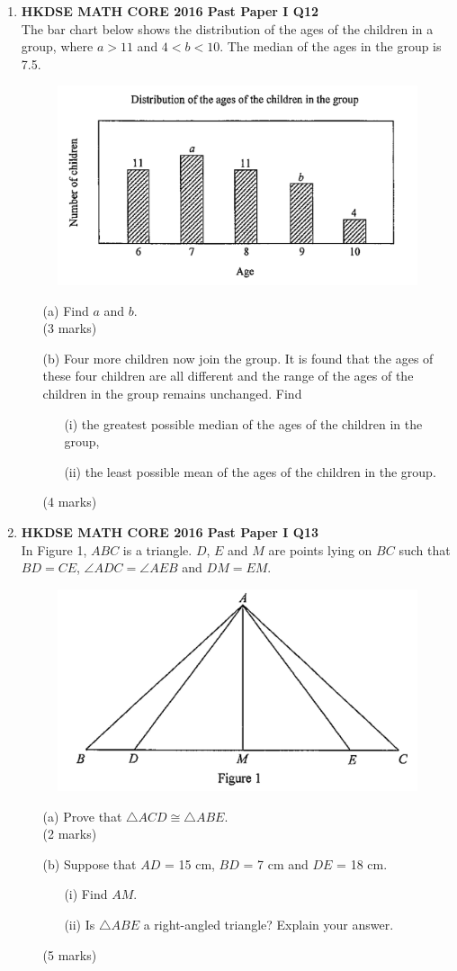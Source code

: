 \documentclass[12pt]{article}
\begin{document}
\begin{enumerate}
	\item \textbf{HKDSE MATH CORE 2016 Past Paper I Q12}\\
	The bar chart below shows the distribution of the ages of the children in a group, where $a > 11$ and $4 < b < 10$. The median of the ages in the group is 7.5.
	\begin{figure}[H]
		\centering
		\includegraphics[width = .3\linewidth]{2016Figure1.00}
	\end{figure}
	\begin{enumerate}
		\item[(a)] Find $a$ and $b$. \\(3 marks)
		\item[(b)] Four more children now join the group. It is found that the ages of these four children are all different and the range of the ages of the children in the group remains unchanged. Find
		\begin{enumerate}
			\item[(i)] the greatest possible median of the ages of the children in the group,
			\item[(ii)] the least possible mean of the ages of the children in the group.
		\end{enumerate}
		(4 marks)
	\end{enumerate}

	\item \textbf{HKDSE MATH CORE 2016 Past Paper I Q13}\\
	In Figure 1, $ABC$ is a triangle. $D$, $E$ and $M$ are points lying on $BC$ such that $BD = CE$, $\angle ADC = \angle AEB$ and $DM = EM$.
	\begin{figure}[H]
		\centering
		\includegraphics[width = .3\linewidth]{2016Figure1.1}
	\end{figure}
	\begin{enumerate}
		\item[(a)] Prove that $\triangle ACD \cong \triangle ABE$. \\(2 marks)
		\item[(b)] Suppose that $AD$ = 15 cm, $BD$ = 7 cm and $DE$ = 18 cm.
		\begin{enumerate}
			\item[(i)] Find $AM$.
			\item[(ii)] Is $\triangle ABE$ a right-angled triangle? Explain your answer.
		\end{enumerate}
		(5 marks)
	\end{enumerate}


\end{enumerate}
\end{document}
